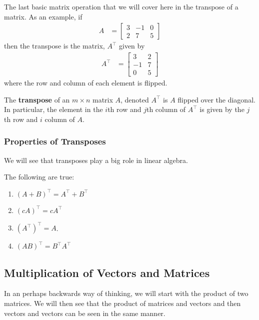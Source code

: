 The last basic matrix operation that we will cover here in the transpose of a matrix.  As an example, if
%
\begin{align*}
	A & =
\begin{bmatrix}
	3 & -1 & 0 \\ 2 & 7 & 5
\end{bmatrix}
\end{align*}
then the transpose is the matrix, $A^{\intercal}$ given by
%
\begin{align*}
	A^{\intercal} & =
\begin{bmatrix}
	3 & 2 \\ -1 & 7 \\ 0 & 5
\end{bmatrix}
\end{align*}
where the row and column of each element is flipped.

\begin{definition}
The \textbf{transpose} of an $m \times n$ matrix $A$,  denoted $A^{\intercal}$ is $A$ flipped over the diagonal.  In particular, the element in the $i$th row and $j$th column of $A^{\intercal}$ is given by the $j$th row and $i$ column of $A$.
\end{definition}

\subsubsection{Properties of Transposes}

We will see that transposes play a big role in linear algebra.

\begin{lemma}
The following are true:
\begin{enumerate}
\item $(A+B)^{\intercal} = A^{\intercal} + B^{\intercal}$
\item $(cA)^{\intercal} = c A^{\intercal}$
\item $(A^{\intercal})^{\intercal} = A$.
\item $(AB)^{\intercal} = B^{\intercal} A^{\intercal}$
\end{enumerate}
\end{lemma}

%
\subsection{Multiplication of Vectors and Matrices}
\label{sect:mult:matrix}

In an perhaps backwards way of thinking, we will start with the product of two matrices.  We will then see that the product of matrices and vectors and then vectors and vectors can be seen in the same manner.

